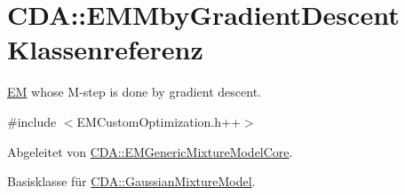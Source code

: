 \hypertarget{classCDA_1_1EMMbyGradientDescent}{
\section{CDA::EMMbyGradientDescent Klassenreferenz}
\label{classCDA_1_1EMMbyGradientDescent}
}


\hyperlink{classCDA_1_1EM}{EM} whose M-\/step is done by gradient descent.  




{\ttfamily \#include $<$EMCustomOptimization.h++$>$}



Abgeleitet von \hyperlink{classCDA_1_1EMGenericMixtureModelCore}{CDA::EMGenericMixtureModelCore}.



Basisklasse für \hyperlink{classCDA_1_1GaussianMixtureModel}{CDA::GaussianMixtureModel}.



